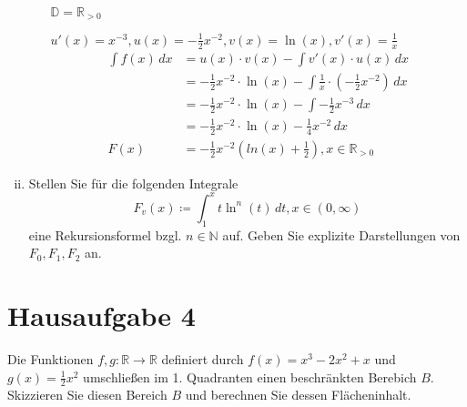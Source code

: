 \documentclass{article}
\begin{document}
\begin{enumerate}[(i)]
\begin{enumerate}[a)]
\begin{landscape}
      $\mathbb{D} = \mathbb{R}_{>0}$

      $u'(x) = x^{-3}, u(x) = -\frac{1}{2}x^{-2}, v(x) = \ln(x), v'(x) = \frac{1}{x}$
      \begin{align*}
        \int f(x)\,dx &= u(x) \cdot v(x) - \int v'(x) \cdot u(x) \,dx \\
                      &= -\frac{1}{2} x^{-2} \cdot \ln(x) - \int \frac{1}{x} \cdot \left(-\frac{1}{2} x^{-2}\right) \,dx \\
                      &= -\frac{1}{2} x^{-2} \cdot \ln(x) - \int -\frac{1}{2} x^{-3} \,dx \\
                      &= -\frac{1}{2} x^{-2} \cdot \ln(x) - \frac{1}{4} x^{-2} \,dx \\
        F(x) &= -\frac{1}{2} x^{-2} (ln(x) + \frac{1}{2}), x \in \mathbb{R}_{>0}
      \end{align*}
    \end{landscape}
  \end{enumerate}

\newpage
\item Stellen Sie für die folgenden Integrale
  \[
    F_v(x) \coloneqq \int_1^x t \ln^n(t) \,dt, x \in (0, \infty)
  \]
  eine Rekursionsformel bzgl. $n \in \mathbb{N}$ auf.
  Geben Sie explizite Darstellungen von $F_0, F_1, F_2$ an.

\end{enumerate}

\newpage
\section*{Hausaufgabe 4}

Die Funktionen $f, g \colon \mathbb{R} \to \mathbb{R}$ definiert durch
$f(x) = x^3 - 2x^2 + x$ und $g(x) = \frac{1}{2}x^2$ umschließen im 1.
Quadranten einen beschränkten Berebich $B$.
Skizzieren Sie diesen Bereich $B$ und berechnen Sie dessen Flächeninhalt.
\\
\end{document}
